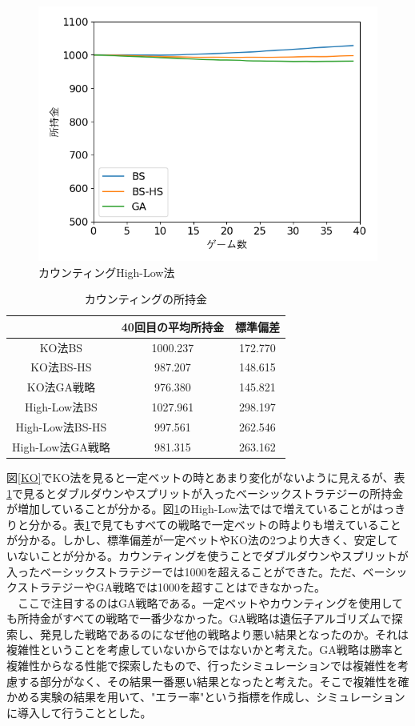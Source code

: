 \begin{figure}[H]
 \begin{center} 
  \includegraphics[width=0.7\linewidth]{./figure/Hi-Lo}
  \caption{カウンティングHigh-Low法\label{Hi-Lo}}
 \end{center}
\end{figure}

\begin{table}[H]
 \caption{カウンティングの所持金\label{countting}}
 \begin{center}
  \begin{tabular}{|c|c|c|}
  \hline  & 40回目の平均所持金 & 標準偏差 \\
  \hline KO法BS & 1000.237 & 172.770\\
  \hline KO法BS-HS & 987.207 & 148.615 \\
  \hline KO法GA戦略 & 976.380 & 145.821\\
  \hline High-Low法BS & 1027.961 & 298.197\\
  \hline High-Low法BS-HS  & 997.561 & 262.546\\
  \hline High-Low法GA戦略 & 981.315 & 263.162\\
  \hline
  \end{tabular}
 \end{center}
\end{table}

図\ref{KO}でKO法を見ると一定ベットの時とあまり変化がないように見えるが、表\ref{countting}で見るとダブルダウンやスプリットが入ったベーシックストラテジーの所持金が増加していることが分かる。図\ref{Hi-Lo}のHigh-Low法ではで増えていることがはっきりと分かる。表\ref{countting}で見てもすべての戦略で一定ベットの時よりも増えていることが分かる。しかし、標準偏差が一定ベットやKO法の2つより大きく、安定していないことが分かる。カウンティングを使うことでダブルダウンやスプリットが入ったベーシックストラテジーでは1000を超えることができた。ただ、ベーシックストラテジーやGA戦略では1000を超すことはできなかった。\\
　ここで注目するのはGA戦略である。一定ベットやカウンティングを使用しても所持金がすべての戦略で一番少なかった。GA戦略は遺伝子アルゴリズムで探索し、発見した戦略であるのになぜ他の戦略より悪い結果となったのか。それは複雑性ということを考慮していないからではないかと考えた。GA戦略は勝率と複雑性からなる性能で探索したもので、行ったシミュレーションでは複雑性を考慮する部分がなく、その結果一番悪い結果となったと考えた。そこで複雑性を確かめる実験の結果を用いて、"エラー率"という指標を作成し、シミュレーションに導入して行うこととした。

